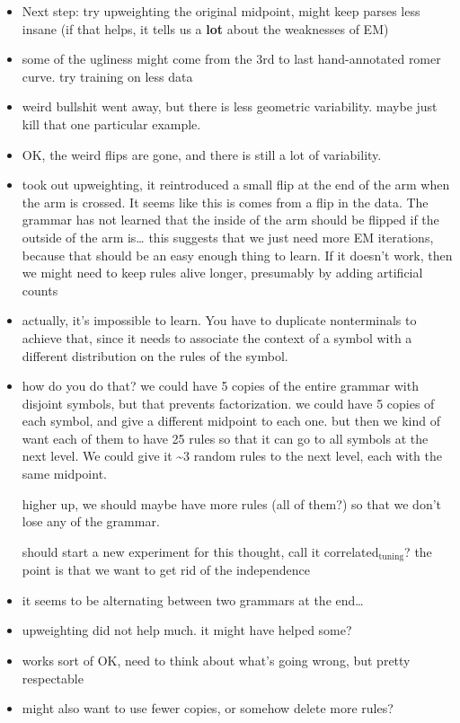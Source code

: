 \documentclass{book}
\begin{document}
\begin{itemize}
\item Next step: try upweighting the original midpoint, might keep parses less
    insane (if that helps, it tells us a \textbf{lot} about the weaknesses of
    EM)
\item some of the ugliness might come from the 3rd to last
    hand-annotated romer curve. try training on less data
\item weird bullshit went away, but there is less geometric
    variability. maybe just kill that one particular example.
\item OK, the weird flips are gone, and there is still a lot of
    variability.
\item took out upweighting, it reintroduced a small flip at the end of
    the arm when the arm is crossed. It seems like this is comes from
    a flip in the data. The grammar has not learned that the inside of
    the arm should be flipped if the outside of the arm is\ldots{} this
    suggests that we just need more EM iterations, because that should
    be an easy enough thing to learn. If it doesn't work, then we
    might need to keep rules alive longer, presumably by adding
    artificial counts
\item actually, it's impossible to learn. You have to duplicate
    nonterminals to achieve that, since it needs to associate the
    context of a symbol with a different distribution on the rules of
    the symbol.
\item how do you do that? we could have 5 copies of the entire grammar
    with disjoint symbols, but that prevents factorization. we could
    have 5 copies of each symbol, and give a different midpoint to
    each one. but then we kind of want each of them to have 25 rules
    so that it can go to all symbols at the next level. We could give
    it \~{}3 random rules to the next level, each with the same midpoint.
  
    higher up, we should maybe have more rules (all of them?) so that
    we don't lose any of the grammar.

    should start a new experiment for this thought, call it
    correlated$_{\mathrm{tuning}}$? the point is that we want to get rid of the
    independence
\item it seems to be alternating between two grammars at the end\ldots{}
\item upweighting did not help much. it might have helped some?
\item works sort of OK, need to think about what's going wrong, but
    pretty respectable
\item might also want to use fewer copies, or somehow delete more rules?
\end{itemize}
\end{document}
